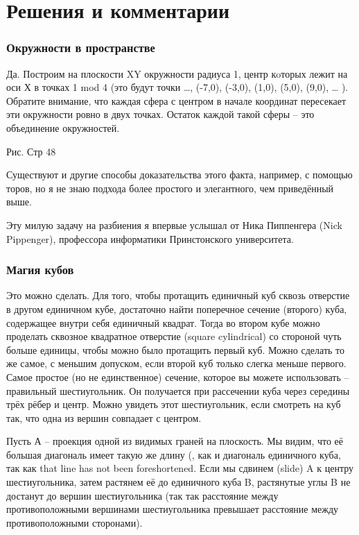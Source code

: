 \section*{Решения и комментарии}

\subsubsection*{Окружности в пространстве}%

Да.
Построим на плоскости XY окружности радиуса 1, центр кoторых лежит на оси Х в точках 1 mod 4 (это будут точки …, (-7,0), (-3,0), (1,0), (5,0), (9,0), … ).
Обратите внимание, что каждая сфера с центром в начале координат пересекает эти окружности ровно в двух точках.
Остаток каждой такой сферы -- это объединение окружностей.

Рис. Стр 48 

Существуют и другие способы доказательства этого факта, например, с помощью торов, но я не знаю подхода более простого и элегантного, чем приведённый выше.

Эту милую задачу на разбиения я впервые услышал от Ника Пиппенгера (Nick Pippenger), профессора информатики Принстонского университета.

\subsubsection*{Магия кубов}%

Это можно сделать.
Для того, чтобы протащить единичный куб сквозь отверстие в другом единичном кубе, достаточно найти поперечное сечение (второго) куба, содержащее внутри себя единичный квадрат.
Тогда во втором кубе можно проделать сквозное квадратное отверстие (square cylindrical) со стороной чуть больше единицы, чтобы можно было протащить первый куб.
Можно сделать то же самое, с меньшим допуском, если второй куб только слегка меньше первого.
Самое простое (но не единственное) сечение, которое вы можете использовать -- правильный шестиугольник.
Он получается при рассечении куба через середины трёх рёбер и центр.
Можно увидеть этот шестиугольник, если смотреть на куб так, что одна из вершин совпадает с центром.

Пусть А -- проекция одной из видимых граней на плоскость.
Мы видим, что её большая диагональ имеет такую же длину (, как и диагональ единичного куба, так как that line has not been foreshortened.
Если мы сдвинем (slide) A к центру шестиугольника, затем растянем её до единичного куба B, растянутые углы B не достанут до вершин шестиугольника (так так расстояние между противоположными вершинами шестиугольника превышает расстояние между противоположными сторонами).

